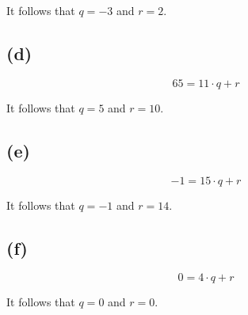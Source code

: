 \documentclass{article}
\begin{document}
It follows that $q=-3$ and $r=2$.
\subsection*{(d)}
\begin{equation*}
	65 = 11 \cdot q + r
\end{equation*}

It follows that $q=5$ and $r=10$.
\subsection*{(e)}
\begin{equation*}
	-1 = 15 \cdot q + r
\end{equation*}

It follows that $q=-1$ and $r=14$.
\subsection*{(f)}
\begin{equation*}
	0 = 4 \cdot q + r
\end{equation*}

It follows that $q=0$ and $r=0$.
\end{document}
